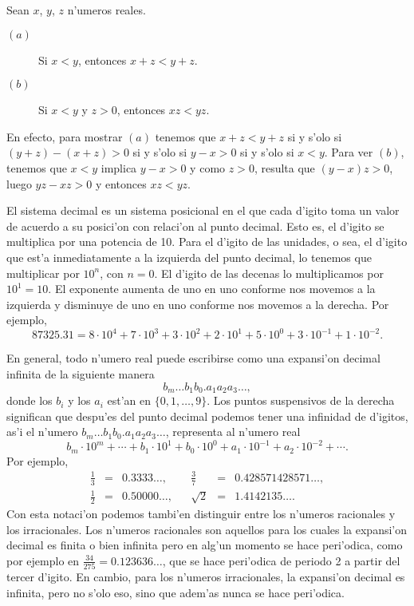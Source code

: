 \begin{ejemplo}  Sean $x$, $y$, $z$ n'umeros reales.
\begin{description}
\item[$(a)$] Si $x<y$, entonces $x+z<y+z$.
\item[$(b)$] Si $x<y$ y $z>0$, entonces $xz<yz$.
\label{ordenenlosreales}
\end{description}
\end{ejemplo}

\noindent En efecto, para mostrar $(a)$ tenemos que $x+z<y+z$ si y s'olo si
$(y+z)-(x+z)>0$ si y s'olo si $y-x>0$ si y s'olo si $x<y$. Para ver $(b)$, tenemos
que $x<y$ implica $y-x>0$ y como $z>0$, resulta que $(y-x)z>0$, luego
$yz-xz>0$ y entonces $xz<yz$.

\ve 






\noindent El sistema decimal es un sistema posicional en el que
cada d'igito toma un valor de acuerdo a su posici'on con relaci'on al punto
decimal. Esto es, el d'igito se multiplica por una potencia de 10.  
Para el d'igito de las unidades, o sea, el
d'igito que est'a inmediatamente a la izquierda del punto decimal, lo  tenemos que multiplicar por $10^n$, con $n=0$.  El d'igito de las decenas lo multiplicamos por $10^1=10$. El exponente
aumenta de uno en uno conforme nos movemos a la izquierda y disminuye de uno en uno conforme nos movemos a la derecha. Por ejemplo,
$$
    87325.31= 8\cdot 10^4+7 \cdot 10^3+3\cdot 10^2+2\cdot 10^1+5\cdot 10^0+3\cdot 10^{-1}+1\cdot 10^{-2}.
$$

\vei

En general, todo n'umero real puede escribirse como una expansi'on decimal 
infinita de la siguiente manera
$$
                 b_m\dots b_1b_0.a_1a_2a_3\dots,
$$
donde los $b_i$ y los $a_i$ est'an en $\{0,1,\dots,9\}$. Los puntos suspensivos
de la derecha significan que despu'es del punto decimal podemos tener una 
infinidad de d'igitos, as'i el n'umero $ b_m\dots b_1b_0.a_1a_2a_3\dots$, 
representa al n'umero real 
$$
b_m\cdot 10^m+\cdots+b_1 \cdot 10^1+b_0\cdot 10^0+a_1\cdot 
10^{-1}+a_2\cdot 10^{-2}+\cdots.
$$
Por ejemplo,
$$
\begin{array}{lcccccl}
    \frac{1}{3} & = & 0.3333\dots, & & \frac{3}{7} & = & 
0.428571428571\dots,\\[.2cm]
    \frac{1}{2} & = & 0.50000\dots, & & \sqrt{2} & = & 1.4142135\dots.
\end{array}
$$
\noindent Con esta notaci'on podemos tambi'en distinguir entre los n'umeros racionales y los irracionales. Los n'umeros racionales son aquellos para los cuales la expansi'on decimal es finita o bien infinita pero en alg'un momento se hace peri'odica, como por ejemplo en $\frac{34}{275}=0.123636 \dots$, que se hace peri'odica de periodo 2 a partir del tercer d'igito. En cambio, para los n'umeros irracionales, la expansi'on decimal es infinita, pero no s'olo eso, sino que adem'as nunca se hace peri'odica.

